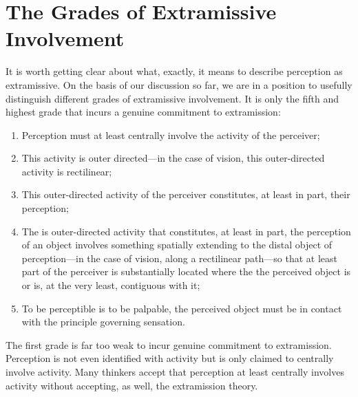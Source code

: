\documentclass[12pt]{article}
\begin{document}


\section{The Grades of Extramissive Involvement} %
\label{sec:extramission}

It is worth getting clear about what, exactly, it means to describe perception as extramissive. On the basis of our discussion so far, we are in a position to usefully distinguish different grades of extramissive involvement. It is only the fifth and highest grade that incurs a genuine commitment to extramission:
\begin{enumerate}
	\item Perception must at least centrally involve the activity of the perceiver;
	\item This activity is outer directed---in the case of vision, this outer-directed activity is rectilinear;
	\item This outer-directed activity of the perceiver constitutes, at least in part, their perception;
	\item The is outer-directed activity that constitutes, at least in part, the perception of an object involves something spatially extending to the distal object of perception---in the case of vision, along a rectilinear path---so that at least part of the perceiver is substantially located where the the perceived object is or is, at the very least, contiguous with it;
	\item To be perceptible is to be palpable, the perceived object must be in contact with the principle governing sensation.
\end{enumerate}

The first grade is far too weak to incur genuine commitment to extramission. Perception is not even identified with activity but is only claimed to centrally involve activity. Many thinkers accept that perception at least centrally involves activity without accepting, as well, the extramission theory. 
\end{document}
